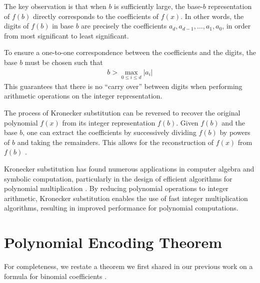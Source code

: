 \documentclass[12pt,reqno]{article}
\theoremstyle{plain}
\theoremstyle{definition}
\begin{document}
The key observation is that when $b$ is sufficiently large, the base-$b$ representation of $f(b)$ directly corresponds to the coefficients of $f(x)$. In other words, the digits of $f(b)$ in base $b$ are precisely the coefficients $a_d, a_{d-1}, \ldots, a_1, a_0$, in order from most significant to least significant.

To ensure a one-to-one correspondence between the coefficients and the digits, the base $b$ must be chosen such that
\begin{align*}
    b > \max_{0 \leq i \leq d} |a_i|
\end{align*}
This guarantees that there is no ``carry over'' between digits when performing arithmetic operations on the integer representation.

The process of Kronecker substitution can be reversed to recover the original polynomial $f(x)$ from its integer representation $f(b)$. Given $f(b)$ and the base $b$, one can extract the coefficients by successively dividing $f(b)$ by powers of $b$ and taking the remainders. This allows for the reconstruction of $f(x)$ from $f(b)$ \cite{grimaldi2004discrete}.

Kronecker substitution has found numerous applications in computer algebra and symbolic computation, particularly in the design of efficient algorithms for polynomial multiplication \cite{harvey2009kronecker, harvey2014faster}. By reducing polynomial operations to integer arithmetic, Kronecker substitution enables the use of fast integer multiplication algorithms, resulting in improved performance for polynomial computations.

\section{Polynomial Encoding Theorem}
For completeness, we restate a theorem we first shared in our previous work on a formula for binomial coefficients \cite{shunia2023simple}.
\end{document}
